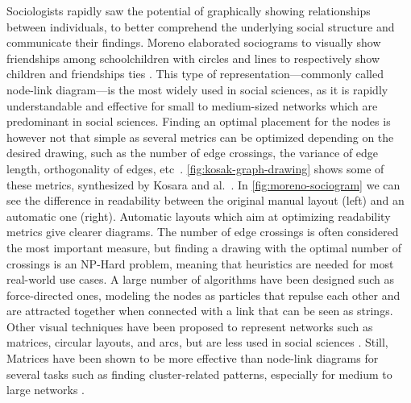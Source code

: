 Sociologists rapidly saw the potential of graphically showing relationships between individuals, to better comprehend the underlying social structure and communicate their findings\cite{freemanVisualizingSocialNetworks2000}.
Moreno elaborated sociograms to visually show friendships among schoolchildren with circles and lines to respectively show children and friendships ties \cite{morenoWhoShallSurvive1934}.
This type of representation---commonly called node-link diagram---is the most widely used in social sciences, as it is rapidly understandable and effective for small to medium-sized networks which are predominant in social sciences.
Finding an optimal placement for the nodes is however not that simple as several metrics can be optimized depending on the desired drawing, such as the number of edge crossings, the variance of edge length, orthogonality of edges, etc~\cite{cristofoliPrincipesUsagesDessins, kosakAutomatingLayoutNetwork1994}. \autoref{fig:kosak-graph-drawing} shows some of these metrics, synthesized by Kosara and al.~\cite{kosakAutomatingLayoutNetwork1994}.
In \autoref{fig:moreno-sociogram} we can see the difference in readability between the original manual layout (left) and an automatic one (right).
Automatic layouts which aim at optimizing readability metrics give clearer diagrams.
The number of edge crossings is often considered the most important measure, but finding a drawing with the optimal number of crossings is an NP-Hard problem, meaning that heuristics are needed for most real-world use cases.
A large number of algorithms have been designed such as force-directed ones\cite{battistaGraphDrawingAlgorithms1998}, modeling the nodes as particles that repulse each other and are attracted together when connected with a link that can be seen as strings.
Other visual techniques have been proposed to represent networks such as matrices, circular layouts, and arcs, but are less used in social sciences \cite{mcguffinSimpleAlgorithmsNetwork2012}.
Still, Matrices have been shown to be more effective than node-link diagrams for several tasks such as finding cluster-related patterns, especially for medium to large networks \cite{ghoniemComparisonReadabilityGraphs2004, abdelaalComparativeEvaluationBipartite2022}.


